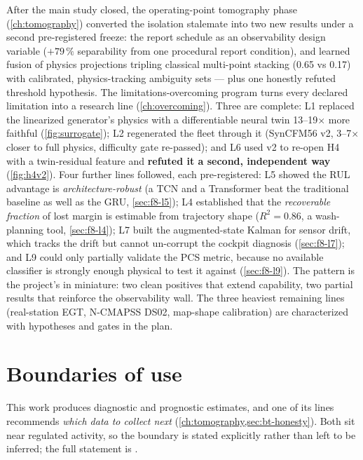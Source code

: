 After the main study closed, the operating-point tomography phase (\cref{ch:tomography})
converted the isolation stalemate into two new results under a second pre-registered
freeze: the report schedule as an observability design variable ($+79\,\%$ separability
from one procedural report condition), and learned fusion of physics projections tripling
classical multi-point stacking (0.65 vs 0.17) with calibrated, physics-tracking ambiguity
sets --- plus one honestly refuted threshold hypothesis. The limitations-overcoming program turns every declared limitation into a research line
(\cref{ch:overcoming}). Three are complete: L1 replaced the linearized generator's physics
with a differentiable neural twin 13--19$\times$ more faithful (\cref{fig:surrogate}); L2
regenerated the fleet through it (SynCFM56 v2, 3--7$\times$ closer to full physics,
difficulty gate re-passed); and L6 used v2 to re-open H4 with a twin-residual feature and
\textbf{refuted it a second, independent way} (\cref{fig:h4v2}). Four further lines followed,
each pre-registered: L5 showed the RUL advantage is \emph{architecture-robust} (a TCN and a
Transformer beat the traditional baseline as well as the GRU, \cref{sec:f8-l5}); L4
established that the \emph{recoverable fraction} of lost margin is estimable from trajectory
shape ($R^2 = 0.86$, a wash-planning tool, \cref{sec:f8-l4}); L7 built the augmented-state
Kalman for sensor drift, which tracks the drift but cannot un-corrupt the cockpit diagnosis
(\cref{sec:f8-l7}); and L9 could only partially validate the PCS metric, because no available
classifier is strongly enough physical to test it against (\cref{sec:f8-l9}). The pattern is
the project's in miniature: two clean positives that extend capability, two partial results
that reinforce the observability wall. The three heaviest remaining lines (real-station EGT,
N-CMAPSS DS02, map-shape calibration) are characterized with hypotheses and gates in the
plan.

\section{Boundaries of use}
\label{sec:boundaries}

This work produces diagnostic and prognostic estimates, and one of its lines recommends
\emph{which data to collect next} (\cref{ch:tomography,sec:bt-honesty}). Both sit near
regulated activity, so the boundary is stated explicitly rather than left to be inferred; the
full statement is .


